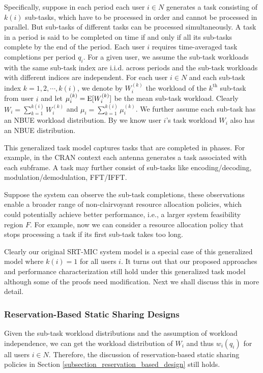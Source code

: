 \documentclass[prodmode,acmtompecs]{acmsmall}
\newcommand{\reqscalar}{q}
\newcommand{\feasibilityRegion}{F}
\newcommand{\fullUserSet}{N}
\begin{document}
Specifically, suppose in each period each user $i\in \fullUserSet$ generates a task consisting of $k(i)$ sub-tasks, which have to be processed in order and cannot be processed in parallel. But sub-tasks of different tasks can be processed simultaneously. A task in a period is said to be completed on time if and only if all its sub-tasks complete by the end of the period. Each user $i$ requires time-averaged task completions per period $\reqscalar_i$. 
For a given user, we assume the sub-task workloads with the same sub-task index are i.i.d. across periods and the sub-task workloads with different indices are independent. 
For each user $i\in \fullUserSet$ and each sub-task index $k=1, 2, \cdots, k(i)$, we denote by $W_i^{(k)}$ the workload of the $k^\text{th}$ sub-task from user $i$ and let $\mu_i^{(k)} =  \operatorname*{\mathrm{E}}[W_i^{(k)}]$ be the mean sub-task workload. Clearly $W_i = \sum\limits_{k=1}^{k(i)} W_i^{(k)}$ and $\mu_i = \sum\limits_{k=1}^{k(i)} \mu_i^{(k)}$. 
We further assume each sub-task has an NBUE workload distribution. By \cite{ShS07b} we know user $i$'s task workload $W_i$ also has an NBUE distribution. 

This generalized task model captures tasks that are completed in phases. For example, in the CRAN context each antenna generates a task associated with each subframe. A task may further consist of sub-tasks like encoding/decoding, modulation/demodulation, FFT/IFFT.

Suppose the system can observe the sub-task completions, these observations enable a broader range of non-clairvoyant resource allocation policies, which could potentially achieve better performance, i.e., a larger system feasibility region $\feasibilityRegion$. For example, now we can consider a resource allocation policy that stops processing a task if its first sub-task takes too long. 

Clearly our original SRT-MIC  system model is a special case of this generalized model where $k(i) = 1$ for all users $i$. 
It turns out that our proposed approaches and performance characterization still hold under this generalized task model although some of the proofs need modification. Next we shall discuss this in more detail. 

\subsubsection{Reservation-Based Static Sharing Designs}

Given the sub-task workload distributions and the assumption of workload independence, we can get the workload distribution of $W_i$ and thus $w_i(q_i)$ for all users $i\in \fullUserSet$. Therefore, the discussion of reservation-based static sharing policies in Section \ref{subsection_reservation_based_design} still holds. 
\end{document}

